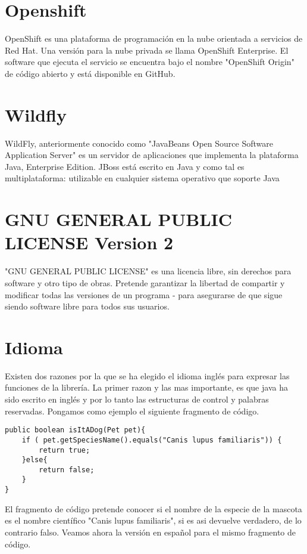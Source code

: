 	\section{Openshift}
		OpenShift es una plataforma de programación en la nube orientada a servicios de Red Hat. Una versión para la nube privada se llama OpenShift Enterprise. El software que ejecuta el servicio se encuentra bajo el nombre "OpenShift Origin" de código abierto y está disponible en GitHub.

	\section{Wildfly}
		WildFly, anteriormente conocido como "JavaBeans Open Source Software Application Server" es un servidor de aplicaciones que implementa la plataforma Java, Enterprise Edition. JBoss está escrito en Java y como tal es multiplataforma: utilizable en cualquier sistema operativo que soporte Java

	\section{GNU GENERAL PUBLIC LICENSE Version 2}

		"GNU GENERAL PUBLIC LICENSE" es una licencia libre, sin derechos para software y otro tipo de obras. Pretende garantizar la libertad de compartir y modificar todas las versiones de un programa - para asegurarse de que sigue siendo software libre para todos sus usuarios.
		
	\section{Idioma}

		Existen dos razones por la que se ha elegido el idioma inglés para expresar las funciones de la librería. La primer razon y las mas importante, es que java ha sido escrito en inglés y por lo tanto las estructuras de control y palabras reservadas. Pongamos como ejemplo el siguiente fragmento de código.

\begin{lstlisting}
public boolean isItADog(Pet pet){
	if ( pet.getSpeciesName().equals("Canis lupus familiaris")) {
		return true;
	}else{
		return false;
	}
}
\end{lstlisting}

	El fragmento de código pretende conocer si el nombre de la especie de la mascota es el nombre científico "Canis lupus familiaris", si es asi devuelve verdadero, de lo contrario falso. Veamos ahora la versión en español para el mismo fragmento de código.

